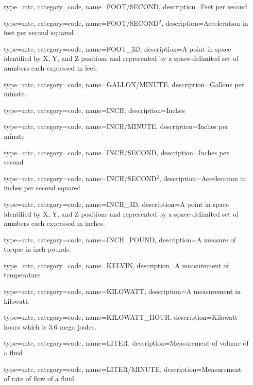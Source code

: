 {
  type=mtc,
  category=code,
  name={FOOT/SECOND},
  description={Feet per second}
}

{
  type=mtc,
  category=code,
  name={FOOT/SECOND$^2$},
  description={Acceleration in feet per second squared}
}

{
  type=mtc,
  category=code,
  name={FOOT\_3D},
  description={A point in space identified by X, Y, and Z positions and represented by a space-delimited set of numbers each expressed in feet.}
}

{
  type=mtc,
  category=code,
  name={GALLON/MINUTE},
  description={Gallons per minute.}
}

{
  type=mtc,
  category=code,
  name={INCH},
  description={Inches}
}

{
  type=mtc,
  category=code,
  name={INCH/MINUTE},
  description={Inches per minute}
}

{
  type=mtc,
  category=code,
  name={INCH/SECOND},
  description={Inches per second}
}

{
  type=mtc,
  category=code,
  name={INCH/SECOND$^2$},
  description={Acceleration in inches per second squared}
}

{
  type=mtc,
  category=code,
  name={INCH\_3D},
  description={A point in space identified by X, Y, and Z positions and represented by a space-delimited set of numbers each expressed in inches.}
}

{
  type=mtc,
  category=code,
  name={INCH\_POUND},
  description={A measure of torque in inch pounds.}
}

{
  type=mtc,
  category=code,
  name={KELVIN},
  description={A measurement of temperature}
}

{
  type=mtc,
  category=code,
  name={KILOWATT},
  description={A measurement in kilowatt.}
}

{
  type=mtc,
  category=code,
  name={KILOWATT\_HOUR},
  description={Kilowatt hours which is 3.6 mega joules.}
}

{
  type=mtc,
  category=code,
  name={LITER},
  description={Measurement of volume of a fluid}
}

{
  type=mtc,
  category=code,
  name={LITER/MINUTE},
  description={Measurement of rate of flow of a fluid}
}

